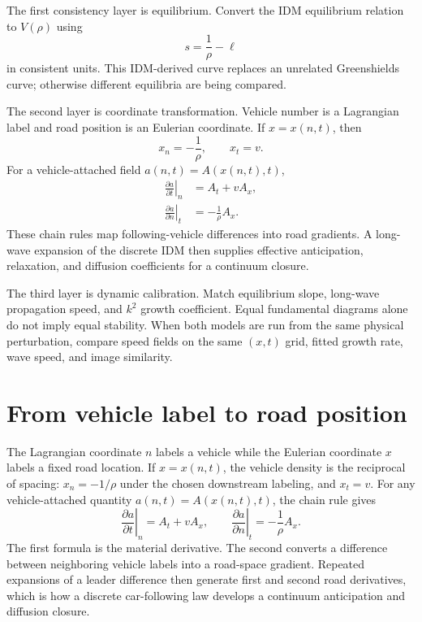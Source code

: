 \documentclass[11pt,a4paper,openany]{book}
\numberwithin{equation}{chapter}
\numberwithin{figure}{chapter}
\numberwithin{table}{chapter}
\begin{document}
The first consistency layer is equilibrium. Convert the IDM equilibrium relation to $V(\rho)$ using
\begin{equation}
s=\frac{1}{\rho}-\ell
\end{equation}
in consistent units. This IDM-derived curve replaces an unrelated Greenshields curve; otherwise different equilibria are being compared.

The second layer is coordinate transformation. Vehicle number is a Lagrangian label and road position is an Eulerian coordinate. If $x=x(n,t)$, then
\begin{equation}
x_n=-\frac{1}{\rho},\qquad x_t=v.
\end{equation}
For a vehicle-attached field $a(n,t)=A(x(n,t),t)$,
\begin{align}
\left.\frac{\partial a}{\partial t}\right|_n&=A_t+vA_x,\\
\left.\frac{\partial a}{\partial n}\right|_t&=-\frac{1}{\rho}A_x.
\end{align}
These chain rules map following-vehicle differences into road gradients. A long-wave expansion of the discrete IDM then supplies effective anticipation, relaxation, and diffusion coefficients for a continuum closure.

The third layer is dynamic calibration. Match equilibrium slope, long-wave propagation speed, and $k^2$ growth coefficient. Equal fundamental diagrams alone do not imply equal stability. When both models are run from the same physical perturbation, compare speed fields on the same $(x,t)$ grid, fitted growth rate, wave speed, and image similarity.

\section{From vehicle label to road position}
The Lagrangian coordinate $n$ labels a vehicle while the Eulerian coordinate $x$ labels a fixed road location. If $x=x(n,t)$, the vehicle density is the reciprocal of spacing: $x_n=-1/\rho$ under the chosen downstream labeling, and $x_t=v$. For any vehicle-attached quantity $a(n,t)=A(x(n,t),t)$, the chain rule gives
\begin{equation}
\left.\frac{\partial a}{\partial t}\right|_n=A_t+vA_x,\qquad
\left.\frac{\partial a}{\partial n}\right|_t=-\frac{1}{\rho}A_x.
\end{equation}
The first formula is the material derivative. The second converts a difference between neighboring vehicle labels into a road-space gradient. Repeated expansions of a leader difference then generate first and second road derivatives, which is how a discrete car-following law develops a continuum anticipation and diffusion closure.
\end{document}
